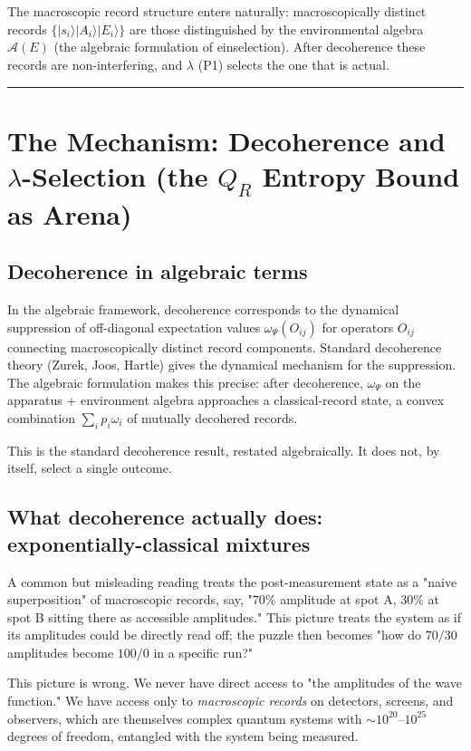 \documentclass[11pt,a4paper]{article}
\begin{document}
The macroscopic record structure enters naturally: macroscopically distinct records $\{|s_i\rangle|A_i\rangle|E_i\rangle\}$ are those distinguished by the environmental algebra $\hat{\mathcal{A}}(E)$ (the algebraic formulation of einselection). After decoherence these records are non-interfering, and $\lambda$ (P1) selects the one that is actual.

\medskip\hrule\medskip

\section{The Mechanism: Decoherence and $\lambda$-Selection (the $Q_R$ Entropy Bound as Arena)}

\subsection{Decoherence in algebraic terms}

In the algebraic framework, decoherence corresponds to the dynamical suppression of off-diagonal expectation values $\omega_\Psi(O_{ij})$ for operators $O_{ij}$ connecting macroscopically distinct record components. Standard decoherence theory (Zurek, Joos, Hartle) gives the dynamical mechanism for the suppression. The algebraic formulation makes this precise: after decoherence, $\omega_\Psi$ on the apparatus + environment algebra approaches a classical-record state, a convex combination $\sum_i p_i \omega_i$ of mutually decohered records.

This is the standard decoherence result, restated algebraically. It does not, by itself, select a single outcome.

\subsection{What decoherence actually does: exponentially-classical mixtures}

A common but misleading reading treats the post-measurement state as a "naive superposition" of macroscopic records, say, "$70\%$ amplitude at spot A, $30\%$ at spot B sitting there as accessible amplitudes." This picture treats the system as if its amplitudes could be directly read off; the puzzle then becomes "how do $70/30$ amplitudes become $100/0$ in a specific run?"

This picture is wrong. We never have direct access to "the amplitudes of the wave function." We have access only to \emph{macroscopic records} on detectors, screens, and observers, which are themselves complex quantum systems with $\sim 10^{20}$–$10^{25}$ degrees of freedom, entangled with the system being measured.
\end{document}
